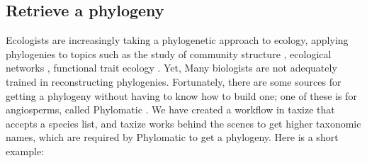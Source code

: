 \documentclass[letterpaper,superscriptaddress,showkeys,longbibliography,10pt]{revtex4-1}\usepackage{graphicx, color}
\begin{document}
\subsection{Retrieve a phylogeny}

Ecologists are increasingly taking a phylogenetic approach to ecology, applying phylogenies to topics such as the study of community structure \cite{webb2002phylogenies}, ecological networks \cite{REF}, functional trait ecology \cite{REF}. Yet, Many biologists are not adequately trained in reconstructing phylogenies. Fortunately, there are some sources for getting a phylogeny without having to know how to build one; one of these is for angiosperms, called Phylomatic \cite{webb2005}. We have created a workflow in taxize that accepts a species list, and taxize works behind the scenes to get higher taxonomic names, which are required by Phylomatic to get a phylogeny. Here is a short example:
\end{document}
